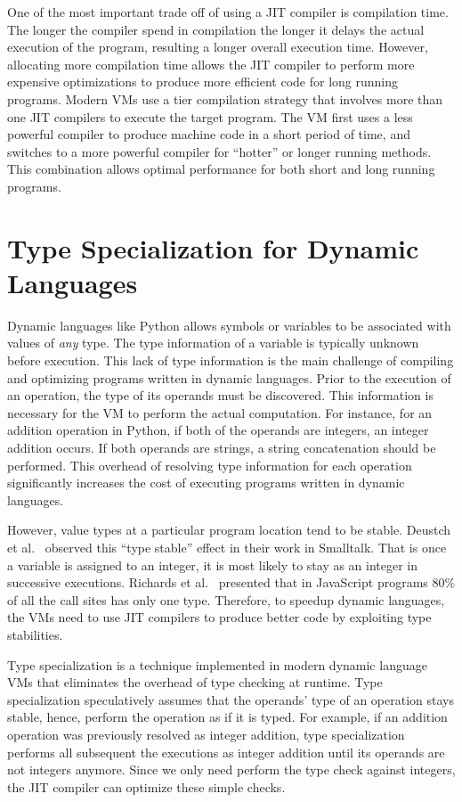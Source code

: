 One of the most important trade off of using a JIT compiler is compilation time.
The longer the compiler spend in compilation the longer it delays the actual execution of the program, resulting a longer overall execution time.
However, allocating more compilation time allows the JIT compiler to perform more expensive optimizations to produce more efficient code for long running programs.
Modern VMs use a tier compilation strategy that involves more than one JIT compilers to execute the target program.
The VM first uses a less powerful compiler to produce machine code in a short period of time, and switches to a more powerful compiler for ``hotter'' or longer running methods.
This combination allows optimal performance for both short and long running programs.

\section{Type Specialization for Dynamic Languages}

Dynamic languages like Python allows symbols or variables to be associated with values of \emph{any} type.
The type information of a variable is typically unknown before execution.
This lack of type information is the main challenge of compiling and optimizing programs written in dynamic languages.
Prior to the execution of an operation, the type of its operands must be discovered.
This information is necessary for the VM to perform the actual computation.
For instance, for an addition operation in Python, if both of the operands are integers, an integer addition occurs.
If both operands are strings, a string concatenation should be performed.
This overhead of resolving type information for each operation significantly increases the cost of executing programs written in dynamic languages.

However, value types at a particular program location tend to be stable.
Deustch et al.~\cite{Deutsch1984} observed this ``type stable'' effect in their work in Smalltalk.
That is once a variable is assigned to an integer, it is most likely to stay as an integer in successive executions.
Richards et al.~\cite{Richards+2010} presented that in JavaScript programs $80\%$ of all the call sites has only one type.
Therefore, to speedup dynamic languages, the VMs need to use JIT compilers to produce better code by exploiting type stabilities.

Type specialization is a technique implemented in modern dynamic language VMs that eliminates the overhead of type checking at runtime.
Type specialization speculatively assumes that the operands' type of an operation stays stable, hence, perform the operation as if it is typed.
For example, if an addition operation was previously resolved as integer addition, type specialization performs all subsequent the executions as integer addition until its operands are not integers anymore.
Since we only need perform the type check against integers, the JIT compiler can optimize these simple checks.

